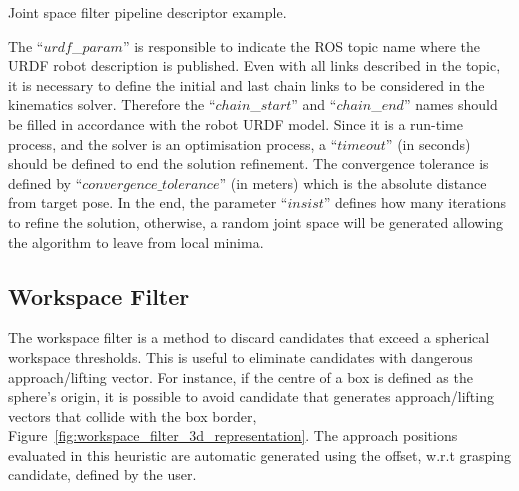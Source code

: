\begin{snippet}[h!]
\centering
{}
\caption{Joint space filter pipeline descriptor example.}
\label{code:joint_space_filter}
\end{snippet}

The ``$urdf$\_$param$'' is responsible to indicate the ROS topic name where the URDF robot description is published. Even with all links described in the topic, it is necessary to define the initial and last chain links to be considered in the kinematics solver. Therefore the ``$chain$\_$start$'' and ``$chain$\_$end$'' names should be filled in accordance with the robot URDF model.  Since it is a run-time process, and the solver is an optimisation process, a ``$timeout$'' (in seconds) should be defined to end the solution refinement. The convergence tolerance is defined by ``$convergence\_tolerance$'' (in meters) which is the absolute distance from target pose.  In the end, the parameter ``$insist$'' defines how many iterations to refine the solution, otherwise, a random joint space will be generated allowing the algorithm to leave from local minima. 






\subsection{Workspace Filter}
\label{cap4:modular_grasping_architecture:sec:grasp_selection:subsec:workspace_filter}

The workspace filter is a method to discard candidates that exceed a spherical workspace thresholds. This is useful to eliminate candidates with dangerous approach/lifting vector. For instance, if the centre of a box is defined as the sphere's origin, it is possible to avoid candidate that generates approach/lifting vectors that collide with the box border, Figure~\ref{fig:workspace_filter_3d_representation}. The approach positions evaluated in this heuristic are automatic generated using the offset, w.r.t grasping candidate, defined by the user.


